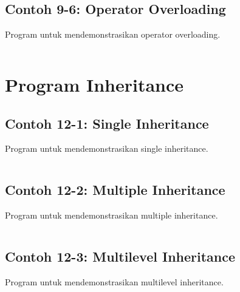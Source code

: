 \subsection{Contoh 9-6: Operator Overloading}

Program untuk mendemonstrasikan operator overloading.

\begin{lstlisting}[language=c++, caption=Operator Overloading]

\end{lstlisting}

\section{Program Inheritance}

\subsection{Contoh 12-1: Single Inheritance}

Program untuk mendemonstrasikan single inheritance.

\begin{lstlisting}[language=c++, caption=Single Inheritance]

\end{lstlisting}

\subsection{Contoh 12-2: Multiple Inheritance}

Program untuk mendemonstrasikan multiple inheritance.

\begin{lstlisting}[language=c++, caption=Multiple Inheritance]

\end{lstlisting}

\subsection{Contoh 12-3: Multilevel Inheritance}

Program untuk mendemonstrasikan multilevel inheritance.

\begin{lstlisting}[language=c++, caption=Multilevel Inheritance]

\end{lstlisting}

